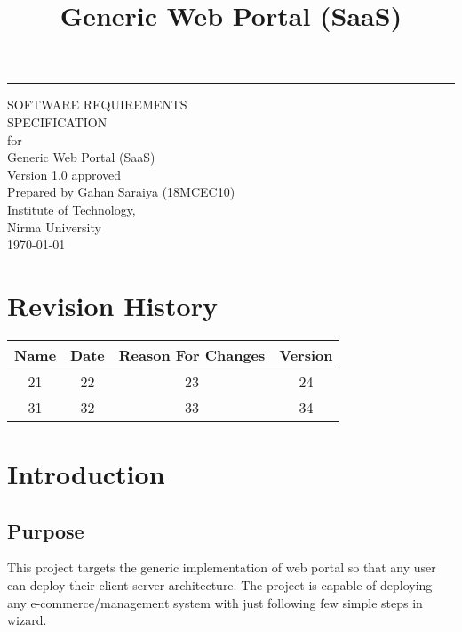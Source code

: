 \documentclass{scrreprt}
\date{}
\title{Generic Web Portal (SaaS)}
\def\myversion{1.0 }
\begin{document}
\begin{flushright}
    \rule{16cm}{5pt}\vskip1cm
    \begin{bfseries}
        \Huge{SOFTWARE REQUIREMENTS\\ SPECIFICATION}\\
        for\\
        \vspace{1.9cm}
        Generic Web Portal (SaaS)\\
        \vspace{1.9cm}
        \LARGE{Version \myversion approved}\\
        \vspace{1.9cm}
        Prepared by Gahan Saraiya (18MCEC10)\\
        \vspace{1.9cm}
        Institute of Technology,\\Nirma University\\
        \vspace{1.9cm}
        \today\\
    \end{bfseries}
\end{flushright}

\tableofcontents
\listoffigures

\chapter*{Revision History}

\begin{center}
    \begin{tabular}{|c|c|c|c|}
        \hline
	    Name & Date & Reason For Changes & Version\\
        \hline
	    21 & 22 & 23 & 24\\
        \hline
	    31 & 32 & 33 & 34\\
        \hline
    \end{tabular}
\end{center}
\chapter{Introduction}
\label{introduction}

\section{Purpose}
\label{purpose}
This project targets the generic implementation of web portal so that any user can deploy their client-server architecture.
The project is capable of deploying any e-commerce/management system with just following few simple steps in wizard.
\end{document}
